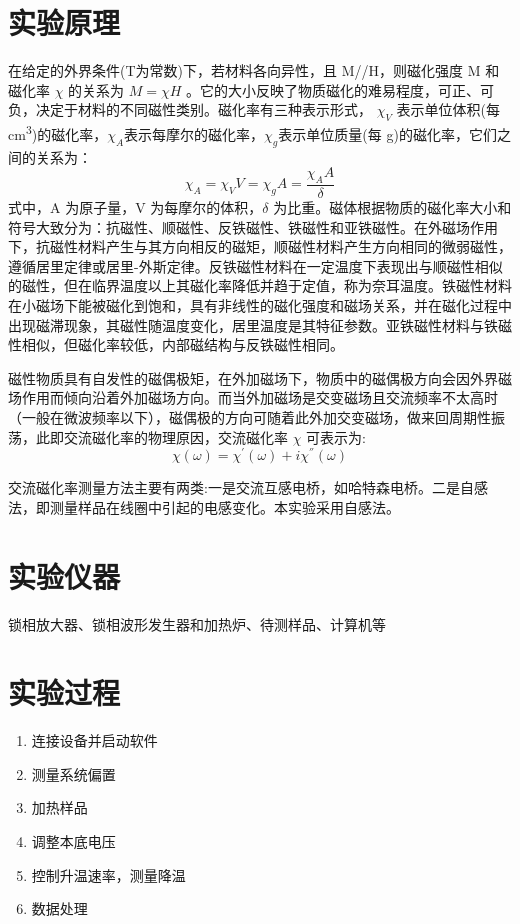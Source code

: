 \documentclass[a4paper,utf8]{article}
\begin{document}
\section{实验原理}
    在给定的外界条件(T为常数)下，若材料各向异性，且 M//H，则磁化强度 M 和磁化率 $\chi$ 的关系为 $M=\chi H$ 。它的大小反映了物质磁化的难易程度，可正、可负，决定于材料的不同磁性类别。磁化率有三种表示形式， $\chi_V$ 表示单位体积(每 \unit{\cm^3})的磁化率，$\chi_A$表示每摩尔的磁化率，$\chi_g$表示单位质量(每 g)的磁化率，它们之间的关系为：
    \begin{equation}
        \chi_{A}=\chi_{V}V=\chi_{g}A=\frac{\chi_{A}A}{\delta}
    \end{equation}
    式中，A 为原子量，V 为每摩尔的体积，$\delta$ 为比重。磁体根据物质的磁化率大小和符号大致分为：抗磁性、顺磁性、反铁磁性、铁磁性和亚铁磁性。在外磁场作用下，抗磁性材料产生与其方向相反的磁矩，顺磁性材料产生方向相同的微弱磁性，遵循居里定律或居里-外斯定律。反铁磁性材料在一定温度下表现出与顺磁性相似的磁性，但在临界温度以上其磁化率降低并趋于定值，称为奈耳温度。铁磁性材料在小磁场下能被磁化到饱和，具有非线性的磁化强度和磁场关系，并在磁化过程中出现磁滞现象，其磁性随温度变化，居里温度是其特征参数。亚铁磁性材料与铁磁性相似，但磁化率较低，内部磁结构与反铁磁性相同。\par
    磁性物质具有自发性的磁偶极矩，在外加磁场下，物质中的磁偶极方向会因外界磁场作用而倾向沿着外加磁场方向。而当外加磁场是交变磁场且交流频率不太高时（一般在微波频率以下），磁偶极的方向可随着此外加交变磁场，做来回周期性振荡，此即交流磁化率的物理原因，交流磁化率 $\chi$ 可表示为:
    \begin{equation}
        \chi(\omega)=\chi^{'}(\omega)+i\chi^{''}(\omega)
    \end{equation}\par
    交流磁化率测量方法主要有两类:一是交流互感电桥，如哈特森电桥。二是自感法，即测量样品在线圈中引起的电感变化。本实验采用自感法。
\section{实验仪器}
    锁相放大器、锁相波形发生器和加热炉、待测样品、计算机等
\section{实验过程}
    \begin{enumerate}
        \item 连接设备并启动软件
        \item 测量系统偏置
        \item 加热样品
        \item 调整本底电压
        \item 控制升温速率，测量降温
        \item 数据处理
    \end{enumerate}
\end{document}
